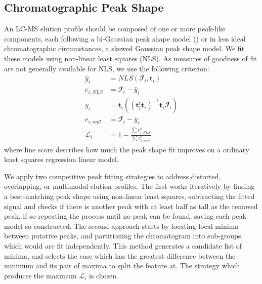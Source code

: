     \subsection{Chromatographic Peak Shape}
        An LC-MS elution profile should be composed of one or more peak-like components, each
        following a bi-Gaussian peak shape model (\cite{Yu2010}) or in less ideal chromatographic
        circumstances, a skewed Gaussian peak shape model. We fit these models using non-linear
        least squares (NLS). As measures of goodness of fit are not generally available for NLS,
        we use the following criterion:
        \begin{align}
            {\hat y_i} &= NLS(\mathbfcal{I}_i, \mathbf{t}_i) \nonumber\\
            e_{i, NLS} &= \mathbfcal{I}_i - {\hat y_i} \nonumber\\
            {\bar y_i} &= \mathbf{t}_i
                \left(
                    \left(
                        \mathbf{t}_i^t\mathbf{t}_i
                    \right)^{-1}\mathbf{t}_i\mathbfcal{I}_i
                \right)\nonumber\\
            e_{i, null} &= \mathbfcal{I}_i - {\bar y_i} \nonumber\\
            \mathscr{L}_i &= 1 - \frac{\sum{e_{i, NLS}^2}}{\sum{e_{i, null}^2}}
        \end{align}
        \noindent where line score describes how much the peak shape fit improves on a ordinary
        least squares regression linear model.

        We apply two competitive peak fitting strategies to address distorted, overlapping, or
        multimodal elution profiles. The first works iteratively by finding a best-matching peak
        shape using non-linear least squares, subtracting the fitted signal and checks if there is
        another peak with at least half as tall as the removed peak, if so repeating the process until
        no peak can be found, saving each peak model so constructed. The second approach starts
        by locating local minima between putative peaks, and partitioning the chromatogram into
        sub-groups which would are fit independently. This method generates a candidate list of
        minima, and selects the case which has the greatest difference between the minimum and its
        pair of maxima to split the feature at. The strategy which produces the maximum $\mathscr{L}_i$
        is chosen.

